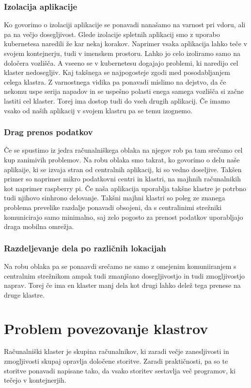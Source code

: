 \documentclass[a4paper, 12pt]{book}
\begin{document}
\subsection{Izolacija aplikacije}
Ko govorimo o izolaciji aplikacije se ponavadi nanašamo na varnost pri vdoru, ali pa na večjo dosegljivost.
Glede izolacije spletnih aplikacij smo z uporabo kubernetesa naredili že kar nekaj korakov.
Naprimer vsaka aplikacija lahko teče v svojem kontejnerju, tudi v imenskem prostoru.
Lahko jo celo izoliramo samo na določera vozlišča.
A vseeno se v kubernetesu dogajajo problemi, ki naredijo cel klaster nedosegljiv.
Kaj takšnega se najpogosteje zgodi med posodabljanjem celega klastra.
Z varnostnega vidika pa ponavadi mislimo na dejstvo, da če nekomu uspe serija napadov in se uspešno polasti enega samega vozlišča si začne lastiti cel klaster.
Torej ima dostop tudi do vseh drugih aplikacij.
Če imamo vsako od naših aplikacij v svojem klastru pa se temu izognemo.
\subsection{Drag prenos podatkov}
Če se spustimo iz jedra računalniškega oblaka na njegov rob pa tam srečamo cel kup zanimivih problemov. 
Na robu oblaka smo takrat, ko govorimo o delu naše aplikaije, ki se izvaja stran od centralnih aplikacij, ki so vedno doseljive.
Takšen primer so naprimer mikro podatkovni centri in klastri, na majhnih računalnikih kot naprimer raspberry pi.
Če naša aplikacija uporablja takšne klastre je potrbno tudi njihovo sinhrono delovanje.
Takšni majhni klastri so poleg ze znanega problema prevelike razdalje ponavadi obsojeni, da s centralinimi strežniki komunicirajo samo minimalno, saj zelo pogosto za prenost podatkov uporabljajo draga mobilna omrežja.
\subsection{Razdeljevanje dela po različnih lokacijah}
Na robu oblaka pa se ponaavdi srečamo ne samo z omejenim komuniiranjem s centralnim strežnikom ampak tudi zmanjšano dosegljivostjo in tudi zmogljivostjo naprav.
Torej če ima en klaster manj dela kot drugi lahko delež tega prenese na druge klastre.
\chapter{Problem povezovanje klastrov}
Računalniški klaster je skupina računalnikov, ki zaradi večje zanesljivosti in zmogljivosti skupaj opravlja določene storitve.
Zaradi praktičnosti, pa so te storitve ponavadi napisane tako, da vsako storitev sestavlja več programov, ki tečejo v kontejnerjih.
\end{document}
